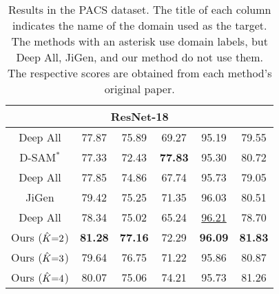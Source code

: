 \documentclass[letterpaper]{article} \usepackage{aaai20}  \usepackage{times}  \usepackage{helvet} \usepackage{courier}  \usepackage[hyphens]{url}  \usepackage{graphicx} \urlstyle{rm} \def\UrlFont{\rm}  \usepackage{graphicx}  \usepackage[whole]{bxcjkjatype}
\begin{document}
\begin{table}[t]
{\begin{tabular}{ccccc|c}
    \multicolumn{6}{c}{ResNet-18}\\ \hline
    Deep All & 77.87 & 75.89 & 69.27 & 95.19 & 79.55 \\ 
    D-SAM$^\ast$ & 77.33 & 72.43 & \textbf{77.83} & 95.30 & 80.72 \\ \hline
    Deep All & 77.85 & 74.86 & 67.74 & 95.73 & 79.05 \\
    JiGen & 79.42 & 75.25 & 71.35 & 96.03 & 80.51 \\ \hline
    Deep All & 78.34 & 75.02 & 65.24 & \underline{96.21} & 78.70 \\
    Ours ($\hat{K}\mathalpha{=}2$) & \textbf{81.28} & \textbf{77.16} & 72.29 & \textbf{96.09} & \textbf{81.83}\\ 
    Ours ($\hat{K}\mathalpha{=}3$) & 79.64 & 76.75 & 71.22 & 95.86 & 80.87\\
    Ours ($\hat{K}\mathalpha{=}4$) & 80.07 & 75.06 & 74.21 & 95.73 & 81.26 \\ \hline
    \end{tabular}
    }
    \caption{Results in the PACS dataset. The title of each column indicates the name of the domain used as the target. The methods with an asterisk use domain labels, but Deep All, JiGen, and our method do not use them. The respective scores are obtained from each method's original paper.}
    \label{tab:PACS}
\end{table}
\end{document}
